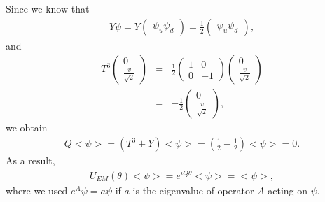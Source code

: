 \documentclass[11pt]{article}
\begin{document}
\section{ }
Since we know that
\begin{eqnarray}
  Y \psi = Y
  \begin{pmatrix}
    \psi_u \psi_d
  \end{pmatrix}
  = \frac{1}{2}
  \begin{pmatrix}
    \psi_u \psi_d
  \end{pmatrix},
\end{eqnarray}
and
\begin{eqnarray}
  T^3 
  \begin{pmatrix}
    0 \\ \frac{v}{\sqrt 2}
  \end{pmatrix}
  &=& \frac{1}{2}
  \begin{pmatrix}
    1 & 0\\0 &-1
  \end{pmatrix}
  \begin{pmatrix}
    0 \\ \frac{v}{\sqrt 2}
  \end{pmatrix} \\
  &=& - \frac{1}{2}
  \begin{pmatrix}
    0 \\ \frac{v}{\sqrt 2}
  \end{pmatrix},
\end{eqnarray}
we obtain
\begin{eqnarray}
  Q <\psi> = (T^3+Y) <\psi> = (\frac{1}{2}-\frac{1}{2})<\psi>=0.
\end{eqnarray}
As a result,
\begin{eqnarray}
  U_{EM}(\theta) <\psi> = e^{iQ\theta}<\psi> = <\psi>,
\end{eqnarray}
where we used $e^{A}\psi=a \psi$ if $a$ is the eigenvalue of operator $A$ acting on $\psi$.
\end{document}
